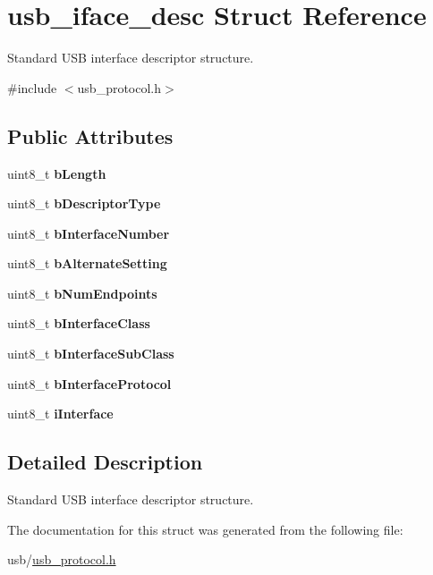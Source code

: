 \hypertarget{structusb__iface__desc}{}\section{usb\+\_\+iface\+\_\+desc Struct Reference}
\label{structusb__iface__desc}


Standard U\+SB interface descriptor structure.  




{\ttfamily \#include $<$usb\+\_\+protocol.\+h$>$}

\subsection*{Public Attributes}
\begin{DoxyCompactItemize}
\item 
\mbox{\label{structusb__iface__desc_ad22b7fa5dd0697a36311d300572378b6}} 
uint8\+\_\+t {\bfseries b\+Length}
\item 
\mbox{\label{structusb__iface__desc_a97ae3fb956e74dd33568852d6603fadb}} 
uint8\+\_\+t {\bfseries b\+Descriptor\+Type}
\item 
\mbox{\label{structusb__iface__desc_a21a115cb72dd13fe49ff0ce3649e6cc9}} 
uint8\+\_\+t {\bfseries b\+Interface\+Number}
\item 
\mbox{\label{structusb__iface__desc_a2d3c271e6fc4e3c9b4e476ed64d10c5e}} 
uint8\+\_\+t {\bfseries b\+Alternate\+Setting}
\item 
\mbox{\label{structusb__iface__desc_ac2c74c8b3f357c780fa8566fb9fadfb3}} 
uint8\+\_\+t {\bfseries b\+Num\+Endpoints}
\item 
\mbox{\label{structusb__iface__desc_a63f6b685d6c1cac09ee6db5a768f3a80}} 
uint8\+\_\+t {\bfseries b\+Interface\+Class}
\item 
\mbox{\label{structusb__iface__desc_aacc64eefd007c8daa5702547f6036f66}} 
uint8\+\_\+t {\bfseries b\+Interface\+Sub\+Class}
\item 
\mbox{\label{structusb__iface__desc_acf5166a74c6966e594ade7ff918853dc}} 
uint8\+\_\+t {\bfseries b\+Interface\+Protocol}
\item 
\mbox{\label{structusb__iface__desc_ac02e0c253c9cc8f5a1dc5426b725a677}} 
uint8\+\_\+t {\bfseries i\+Interface}
\end{DoxyCompactItemize}


\subsection{Detailed Description}
Standard U\+SB interface descriptor structure. 

The documentation for this struct was generated from the following file\+:\begin{DoxyCompactItemize}
\item 
usb/\hyperlink{usb__protocol_8h}{usb\+\_\+protocol.\+h}\end{DoxyCompactItemize}
